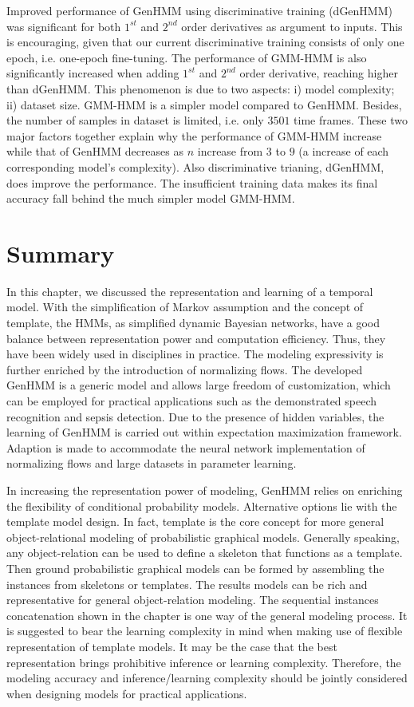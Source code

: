 Improved performance of GenHMM using discriminative training (dGenHMM) was significant for both $1^{st}$ and $2^{nd}$ order derivatives as argument to inputs.
This is encouraging, given that our current discriminative training consists of only one epoch, i.e. one-epoch fine-tuning.
The performance of GMM-HMM is also significantly increased when adding $1^{st}$ and $2^{nd}$ order derivative, reaching higher than dGenHMM.
This phenomenon is due to two aspects: i) model complexity; ii) dataset size. GMM-HMM is a simpler model compared to GenHMM. Besides, the number of samples in dataset is limited, i.e. only $3501$ time frames. These two major factors together explain why the performance of GMM-HMM increase while that of GenHMM decreases as $n$ increase from $3$ to $9$ (a increase of each corresponding model's complexity).
Also discriminative trianing, dGenHMM, does improve the performance. The insufficient training data makes its final accuracy fall behind the much simpler model GMM-HMM.

\section{Summary}
In this chapter, we discussed the representation and learning of a temporal model. With the simplification of Markov assumption and the concept of template, the HMMs, as simplified dynamic Bayesian networks, have a good balance between representation power and computation efficiency. Thus, they have been widely used in disciplines in practice. The modeling expressivity is further enriched by the introduction of normalizing flows. The developed GenHMM is a generic model and allows large freedom of customization, which can be employed for practical applications such as the demonstrated speech recognition and sepsis detection. Due to the presence of hidden variables, the learning of GenHMM is carried out within expectation maximization framework. Adaption is made to accommodate the neural network implementation of normalizing flows and large datasets in parameter learning.

In increasing the representation power of modeling, GenHMM relies on enriching the flexibility of conditional probability models. Alternative options lie with the template model design. In fact, template is the core concept for more general object-relational modeling of probabilistic graphical models. Generally speaking, any object-relation can be used to define a skeleton that functions as a template. Then ground probabilistic graphical models can be formed by assembling the instances from skeletons or templates. The results models can be rich and representative for general object-relation modeling. The sequential instances concatenation shown in the chapter is one way of the general modeling process. It is suggested to bear the learning complexity in mind when making use of flexible representation of template models. It may be the case that the best representation brings prohibitive inference or learning complexity. Therefore, the modeling accuracy and inference/learning complexity should be jointly considered when designing models for practical applications.

